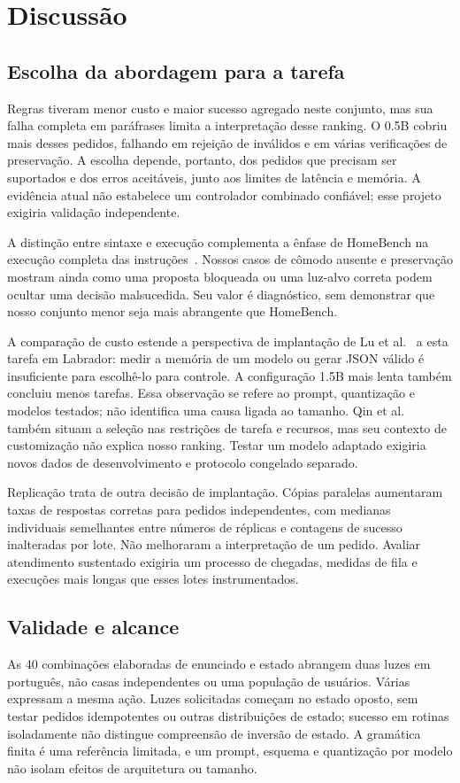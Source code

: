 \documentclass[letterpaper,conference]{IEEEtran}
\begin{document}
\section{Discussão}
\subsection{Escolha da abordagem para a tarefa}
Regras tiveram menor custo e maior sucesso agregado neste conjunto, mas sua falha completa em paráfrases limita a interpretação desse ranking. O 0.5B cobriu mais desses pedidos, falhando em rejeição de inválidos e em várias verificações de preservação. A escolha depende, portanto, dos pedidos que precisam ser suportados e dos erros aceitáveis, junto aos limites de latência e memória. A evidência atual não estabelece um controlador combinado confiável; esse projeto exigiria validação independente.

A distinção entre sintaxe e execução complementa a ênfase de HomeBench na execução completa das instruções~\cite{homebench}. Nossos casos de cômodo ausente e preservação mostram ainda como uma proposta bloqueada ou uma luz-alvo correta podem ocultar uma decisão malsucedida. Seu valor é diagnóstico, sem demonstrar que nosso conjunto menor seja mais abrangente que HomeBench.

A comparação de custo estende a perspectiva de implantação de Lu et al.~\cite{edge} a esta tarefa em Labrador: medir a memória de um modelo ou gerar JSON válido é insuficiente para escolhê-lo para controle. A configuração 1.5B mais lenta também concluiu menos tarefas. Essa observação se refere ao prompt, quantização e modelos testados; não identifica uma causa ligada ao tamanho. Qin et al.~\cite{empirical} também situam a seleção nas restrições de tarefa e recursos, mas seu contexto de customização não explica nosso ranking. Testar um modelo adaptado exigiria novos dados de desenvolvimento e protocolo congelado separado.

Replicação trata de outra decisão de implantação. Cópias paralelas aumentaram taxas de respostas corretas para pedidos independentes, com medianas individuais semelhantes entre números de réplicas e contagens de sucesso inalteradas por lote. Não melhoraram a interpretação de um pedido. Avaliar atendimento sustentado exigiria um processo de chegadas, medidas de fila e execuções mais longas que esses lotes instrumentados.

\subsection{Validade e alcance}
As 40 combinações elaboradas de enunciado e estado abrangem duas luzes em português, não casas independentes ou uma população de usuários. Várias expressam a mesma ação. Luzes solicitadas começam no estado oposto, sem testar pedidos idempotentes ou outras distribuições de estado; sucesso em rotinas isoladamente não distingue compreensão de inversão de estado. A gramática finita é uma referência limitada, e um prompt, esquema e quantização por modelo não isolam efeitos de arquitetura ou tamanho.
\end{document}
